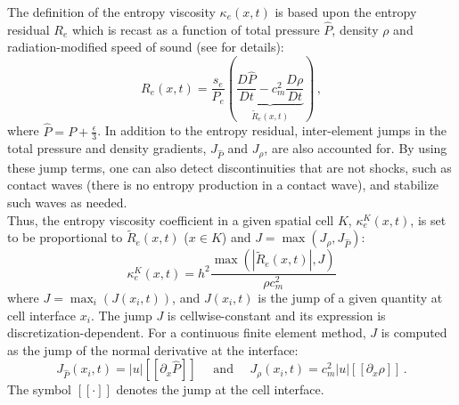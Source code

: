 \documentclass[times,doublespace]{fldauth}%
\begin{document}
The definition of the entropy viscosity $\kappa_e(x,t)$ is based upon the entropy residual $R_e$ which is recast as a function of 
total pressure $\hat{P}$, density $\rho$ and radiation-modified speed of sound (see \cite{our_jcp_radhy_paper} for details):
%
\begin{equation}
\label{eq:equation9}
R_e(x,t) = \frac{s_e}{P_e} \left(  \underbrace{ \frac{D\hat{P}}{Dt} - c_m^2 \frac{D\rho}{Dt} }_\textrm{$\tilde{R}_e(x,t)$} \right) \, ,
\end{equation}
where $\hat{P} = P + \frac{\epsilon}{3}$.
%
In addition to the entropy residual, inter-element jumps in the total pressure and density gradients, $J_{\hat{P}}$ and $J_{\rho}$, are also accounted for. 
By using these jump terms, one can also detect discontinuities that are not shocks, such as contact waves (there is no entropy production in a contact wave), 
and stabilize such waves as needed. \\
Thus, the entropy viscosity coefficient in a given spatial cell $K$, $\kappa^K_e(x,t)$, is set to be proportional to $\tilde{R}_e(x,t)$ ($x \in K$)
and $J= \max( J_{\rho}, J_{\hat{P}})$: 
\begin{equation}
\label{eq:equation12}
\kappa^K_e(x,t) = h^2 \frac{\max (|\tilde{R}_e(x,t)|, J)}{\rho c^2_m}
\end{equation} 
where $J = \max_i (J(x_i,t))$, and $J(x_i,t)$ is the jump of a given quantity at cell interface $x_i$. The jump $J$ is cellwise-constant and its expression is discretization-dependent. For a continuous finite element method, $J$ is computed as the
jump of the normal derivative at the interface: 
\begin{equation}\label{eq:equation13}
J_{\hat{P}}(x_i,t) = |u| [[\partial_x \hat{P}]] \quad \text{ and } \quad 
J_{\rho}(x_i,t) = c_m^2 |u|  [[\partial_x \rho]] \,.
\end{equation}
The symbol $[[ \cdot ]]$ denotes the jump at the cell interface.
%
\end{document}
